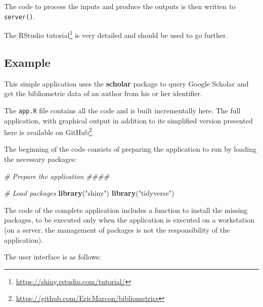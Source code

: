 \documentclass[
  12pt,
  american,
  a4paper,
  extrafontsizes,onecolumn,openright
  ]{memoir}
\newenvironment{Shaded}{\begin{snugshade}}{\end{snugshade}}
\newcommand{\CommentTok}[1]{\textcolor[rgb]{0.56,0.35,0.01}{\textit{#1}}}
\newcommand{\FunctionTok}[1]{\textcolor[rgb]{0.13,0.29,0.53}{\textbf{#1}}}
\newcommand{\NormalTok}[1]{#1}
\newcommand{\StringTok}[1]{\textcolor[rgb]{0.31,0.60,0.02}{#1}}
\newlength{\rf}
\begin{document}
The code to process the inputs and produce the outputs is then written to \texttt{server()}.

The RStudio tutorial\footnote{\url{https://shiny.rstudio.com/tutorial/}} is very detailed and should be used to go further.

\subsection{Example}\label{example}

This simple application uses the \textbf{scholar} package to query Google Scholar and get the bibliometric data of an author from his or her identifier.

The \texttt{app.R} file contains all the code and is built incrementally here.
The full application, with graphical output in addition to its simplified version presented here is available on GitHub\footnote{\url{https://github.com/EricMarcon/bibliometrics}}.

The beginning of the code consists of preparing the application to run by loading the necessary packages:

\scriptsize

\begin{Shaded}
\begin{Highlighting}[]
\CommentTok{\# Prepare the application \#\#\#\#}

\CommentTok{\# Load packages}
\FunctionTok{library}\NormalTok{(}\StringTok{"shiny"}\NormalTok{)}
\FunctionTok{library}\NormalTok{(}\StringTok{"tidyverse"}\NormalTok{)}
\end{Highlighting}
\end{Shaded}

\normalsize

The code of the complete application includes a function to install the missing packages, to be executed only when the application is executed on a workstation (on a server, the management of packages is not the responsibility of the application).

The user interface is as follows:

\scriptsize
\end{document}
